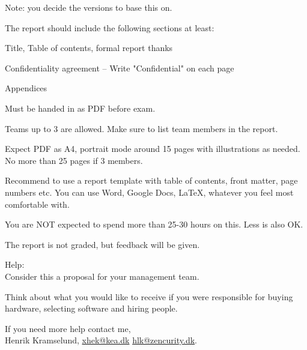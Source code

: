 \documentclass[a4paper,11pt,notitlepage,landscape]{report}
\begin{document}
Note: you decide the versions to base this on.

The report should include the following sections at least:
\begin{list2}
\item Title, Table of contents, formal report thanks
\item Confidentiality agreement -- Write "Confidential" on each page
\item Appendices
\end{list2}


Must be handed in as PDF before exam.

Teams up to 3 are allowed. Make sure to list team members in the report.

Expect PDF as A4, portrait mode around 15 pages with illustrations as needed.
No more than 25 pages if 3 members.

Recommend to use a report template with table of contents, front matter, page numbers etc. You can use Word, Google Docs, \LaTeX, whatever you feel most comfortable with.

You are NOT expected to spend more than 25-30 hours on this. Less is also OK.

The report is not graded, but feedback will be given.

Help:\\
Consider this a proposal for your management team.

Think about what you would like to receive if you were responsible for buying hardware, selecting software and hiring people.

If you need more help contact me,\\


Henrik Kramselund, \url{xhek@kea.dk} \url{hlk@zencurity.dk}.
\end{document}
